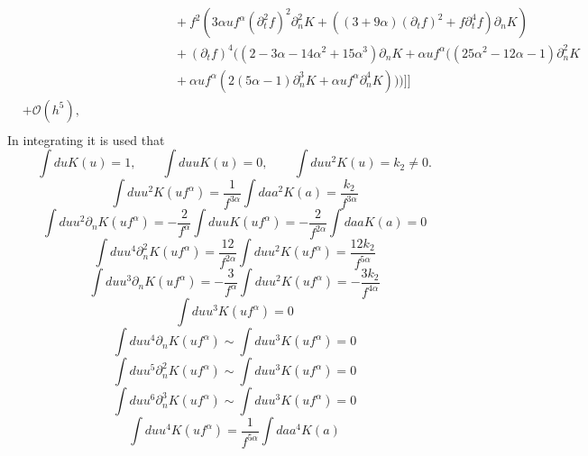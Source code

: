 \begin{equation}
\begin{split}
		&\qquad\qquad\qquad\qquad\qquad\qquad+f^2(3\alpha uf^\alpha (\partial_t^2f)^2\partial_n^2K+((3+9\alpha)(\partial_tf)^2+f\partial_t^4f)\partial_nK)\\
		&\qquad\qquad\qquad\qquad\qquad\qquad+(\partial_tf)^4((2-3\alpha-14\alpha^2+15\alpha^3)\partial_nK+\alpha uf^\alpha ((25\alpha^2-12\alpha-1)\partial_n^2K\\
		& \qquad\qquad\qquad\qquad\qquad\qquad+\alpha u f^\alpha (2(5\alpha-1)\partial_n^3K+\alpha uf^\alpha  \partial_n^4K)))]\bigg]\\
		&+\mathcal{O}(h^5),\\
	\end{split}
\end{equation}
In integrating it is used that 
\begin{equation}
	\int du K(u)=1,\qquad \int du uK(u)=0,\qquad \int du u^2K(u)=k_2\neq 0.
\end{equation}
\begin{equation}
	\int du u^2 K(uf^\alpha )=\frac{1}{f^{3\alpha}}\int da a^2 K(a)=\frac{k_2}{f^{3\alpha}}
\end{equation}
\begin{equation}
	\int du u^2 \partial_nK(uf^\alpha )=-\frac{2}{f^\alpha}\int du uK(uf^\alpha )=-\frac{2}{f^{2\alpha} }\int da aK(a)=0
\end{equation}
\begin{equation}
	\int du u^4 \partial_n^2K(uf^\alpha )=\frac{12}{f^{2\alpha} }\int du u^2K(uf^\alpha )=\frac{12k_2}{f^{5\alpha}}
\end{equation}
\begin{equation}
	\int du u^3 \partial_nK(uf^\alpha )=-\frac{3 }{f^\alpha}\int du u^2 K(uf^\alpha )=-\frac{3k_2}{f^{4\alpha}}
\end{equation}
\begin{equation}
	\int du u^3 K(uf^\alpha )=0
\end{equation}
\begin{equation}
	\int du u^4 \partial_nK(uf^\alpha )\sim \int du u^3 K(uf^\alpha )=0
\end{equation}
\begin{equation}
	\int du u^5 \partial_n^2K(uf^\alpha )\sim \int du u^3 K(uf^\alpha )=0
\end{equation}
\begin{equation}
	\int du u^6 \partial_n^3K(uf^\alpha )\sim \int du u^3 K(uf^\alpha )=0
\end{equation}
\begin{equation}
	\int du u^4 K(uf^\alpha )=\frac{1}{f^{5\alpha}}\int da a^4 K(a)
\end{equation}

